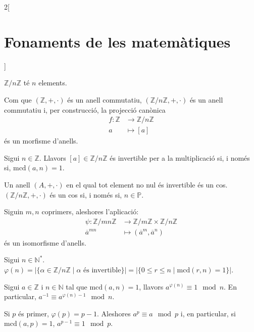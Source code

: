 \documentclass[../../../main.tex]{subfiles}
\begin{document}
\begin{multicols}{2}[\section{Fonaments de les matemàtiques}]
\begin{definition}
\end{definition}
\begin{lemma}
$\mathbb{Z}/n\mathbb{Z}$ té $n$ elements.
\end{lemma}
\begin{theorem}
Com que $(\mathbb{Z},+,\cdot)$ és un anell commutatiu, $(\mathbb{Z}/n\mathbb{Z},+,\cdot)$ és un anell commutatiu i, per construcció, la projecció canònica 
\begin{align*}
    f:\mathbb{Z}&\rightarrow\mathbb{Z}/n\mathbb{Z}\\
    a&\mapsto[a]
\end{align*}és un morfisme d'anells.
\end{theorem}
\begin{lemma}
Sigui $n\in\mathbb{Z}$. Llavors $[a]\in\mathbb{Z}/n\mathbb{Z}$ és invertible per a la multiplicació si, i només si, $\text{mcd}(a,n)=1$.
\end{lemma}
\begin{corollary}
Un anell $(A,+,\cdot)$ en el qual tot element no nul és invertible és un cos. $(\mathbb{Z}/n\mathbb{Z},+,\cdot)$ és un cos si, i només si, $n\in\mathbb{P}$.
\end{corollary}
\begin{theorem}
Siguin $m,n$ coprimers, aleshores l'aplicació:
\begin{align*}
    \psi:\mathbb{Z}/mn\mathbb{Z}&\rightarrow\mathbb{Z}/m\mathbb{Z}\times\mathbb{Z}/n\mathbb{Z}\\
    \overline{a}^{\scriptscriptstyle mn}&\mapsto(\overline{a}^{\scriptscriptstyle m},\overline{a}^{\scriptscriptstyle n})
\end{align*}
és un isomorfisme d'anells.
\end{theorem}
\begin{definition}
Sigui $n\in\mathbb{N}^*$. $\varphi(n)=|\{\alpha\in\mathbb{Z}/n\mathbb{Z}\mid\alpha \text{ és invertible}\}|=|\{0\leq r\leq n\mid \text{mcd}(r,n)=1\}|$.
\end{definition}
\begin{theorem}
Sigui $a\in\mathbb{Z}$ i $n\in\mathbb{N}$ tal que $\text{mcd}(a,n)=1$, llavors $a^{\varphi(n)}\equiv 1\mod n$. En particular, $a^{-1}\equiv a^{\varphi(n)-1}\mod n$.
\end{theorem}
\begin{theorem}
Si $p$ és primer, $\varphi(p)=p-1$. Aleshores $a^p\equiv a\mod p$ i, en particular, si $\text{mcd}(a,p)=1$, $a^{p-1}\equiv 1\mod p$.
\end{theorem}

\end{multicols}
\end{document}
